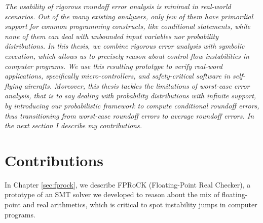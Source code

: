 %
\emph{The usability of rigorous roundoff error analysis is minimal in real-world scenarios.
%
Out of the many existing analyzers, only few of them have primordial support for common programming constructs, like conditional statements, while none of them can deal with unbounded input variables nor probability distributions.
%	
In this thesis, we combine rigorous error analysis with symbolic execution, which allows us to precisely reason about control-flow instabilities in computer programs.
%
We use this resulting prototype to verify real-word applications, specifically micro-controllers, and safety-critical software in self-flying aircrafts. 
%
Moreover, this thesis tackles the limitations of worst-case error analysis, that is to say dealing with probability distributions with infinite support, by introducing our probabilistic framework to compute conditional roundoff errors, thus transitioning from worst-case roundoff errors to average roundoff errors.
%
%
In the next section I describe my contributions.
}

%
%
%

%
\section{Contributions}
%
In Chapter \ref{sec:fprock}, we describe FPRoCK (Floating-Point Real Checker), a prototype of an SMT solver we developed to reason about the mix of floating-point and real arithmetics, which is critical to spot instability jumps in computer programs.

